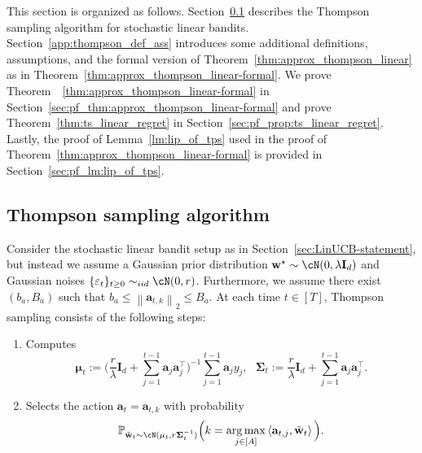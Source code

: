 \documentclass[10pt]{article}
\newcommand{\id}{\bI}
\newcommand{\eps}{\varepsilon}
\DeclareMathOperator*{\argmax}{arg\,max}
\newcommand{\norm}[1]{\left\|{#1}\right\|} %
\newcommand{\ltwo}[1]{\norm{#1}_2} %
\newcommand{\<}{\left\langle}
\renewcommand{\>}{\right\rangle}
\renewcommand{\P}{\mathbb{P}}
\newcommand{\Tpsmean}{{{\mathbf\mu}}}
\newcommand{\Tpscov}{{{\mathbf\Sigma}}}
\newcommand{\Tpssam}{{\tilde\bw}}
\newcommand{\Tpspar}{{\lambda}}  %
\newcommand{\Tpsparn}{{r}} %
\newcommand{\totlen}{{T}} %
\def\bI{{\mathbf I}}
\def\ba{{\mathbf a}}
\def\bw{{\mathbf w}}
\begin{document}
This section is organized as follows. Section~\ref{app:ts_algorithm_formula} describes the Thompson sampling algorithm for stochastic linear bandits. Section~\ref{app:thompson_def_ass} introduces some additional definitions, assumptions, and the formal version of Theorem~\ref{thm:approx_thompson_linear} as in Theorem~\ref{thm:approx_thompson_linear-formal}.
We prove Theorem~~\ref{thm:approx_thompson_linear-formal} in Section~\ref{sec:pf_thm:approx_thompson_linear-formal} and prove Theorem~\ref{thm:ts_linear_regret} in Section~\ref{sec:pf_prop:ts_linear_regret}. Lastly, the proof of Lemma~\ref{lm:lip_of_tps} used in the proof of Theorem~\ref{thm:approx_thompson_linear-formal} is provided in Section~\ref{sec:pf_lm:lip_of_tps}.



\subsection{Thompson sampling algorithm}\label{app:ts_algorithm_formula}
Consider the stochastic linear bandit setup as in Section~\ref{sec:LinUCB-statement}, but instead we assume a  Gaussian prior distribution $\bw^\star\sim \cN(0,\Tpspar\id_d)$ and Gaussian noises $\{ \eps_t \}_{t \ge 0} \sim_{iid} \cN(0,\Tpsparn)$. Furthermore, we assume there exist $(b_a, B_a)$ such that $b_a\leq\ltwo{\ba_{t,k}}\leq B_a$. At each time $t\in[\totlen]$, Thompson sampling consists of the following steps:
\begin{enumerate}
    \item Computes 
    \[
    \Tpsmean_t:= \Big(\frac{\Tpsparn}{\Tpspar  }\id_{d}+\sum_{j=1}^{t-1}\ba_j\ba_j^\top \Big)^{-1}\sum_{j=1}^{t-1}\ba_j y_j,~~~
\Tpscov_t:=\frac{\Tpsparn}{\Tpspar  }\id_{d}+\sum_{j=1}^{t-1}\ba_j\ba_j^\top.
\]
\item Selects the action $\ba_{t}=\ba_{t,k}$ with probability 
\[
\P_{\Tpssam_t\sim\cN(\Tpsmean_t,\Tpsparn\Tpscov_t^{-1})}\Big(k =\argmax_{j \in[A]}\<\ba_{t,j},\Tpssam_t\> \Big). 
\]
\end{enumerate}
\end{document}
